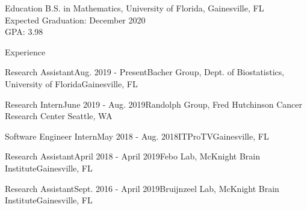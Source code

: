 \documentclass{resume}
\begin{document}
 
 
\begin{rSection}{Education} 
B.S. in Mathematics, University of Florida, Gainesville, FL \\
Expected Graduation: December 2020 \\
GPA: 3.98

\end{rSection}


\begin{rSection}{Experience}

\begin{rSubsection}{Research Assistant}{Aug. 2019 - Present}{Bacher Group, Dept. of
Biostatistics, University of Florida}{Gainesville, FL}
\end{rSubsection}

\begin{rSubsection}{Research Intern}{June 2019 - Aug. 2019}{Randolph
    Group, Fred Hutchinson Cancer Research Center}
{Seattle, WA}
\end{rSubsection}

\begin{rSubsection}{Software Engineer Intern}{May 2018 - Aug. 2018}{ITProTV}{Gainesville, FL}
\end{rSubsection} 

\begin{rSubsection}{Research Assistant}{April 2018 - April 2019}{Febo Lab, McKnight Brain Institute}{Gainesville, FL}
\end{rSubsection}



\begin{rSubsection}{Research Assistant}{Sept. 2016 - April 2019}{Bruijnzeel Lab, McKnight Brain Institute}{Gainesville, FL}
     \end{rSubsection}
     
\end{rSection}
\end{document}

